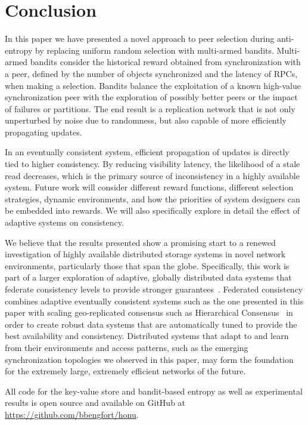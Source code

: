 \section*{Conclusion}

In this paper we have presented a novel approach to peer selection during
anti-entropy by replacing uniform random selection with multi-armed bandits.
Multi-armed bandits consider the historical reward obtained from
synchronization with a peer, defined by the number of objects synchronized
and the latency of RPCs, when making a selection.
Bandits balance the exploitation of a known high-value synchronization
peer with the exploration of possibly better peers or the impact of
failures or partitions.
The end result is a replication network that is not only unperturbed by noise
due to randomness, but also capable of more efficiently propagating updates.

In an eventually consistent system, efficient propagation of updates is
directly tied to higher consistency.
By reducing visibility latency, the likelihood of a stale read decreases,
which is the primary source of inconsistency in a highly available system.
Future work will consider different reward functions, different selection
strategies, dynamic environments, and how the priorities of system designers
can be embedded into rewards.
We will also specifically explore in detail the effect of adaptive systems
on consistency.

We believe that the results presented show a promising start to a renewed
investigation of highly available distributed storage systems in novel
network environments, particularly those that span the globe.
Specifically, this work is part of a larger exploration of adaptive,
globally distributed data systems that federate consistency levels to provide
stronger guarantees~\cite{bengfort_federating_2017}.
Federated consistency combines adaptive eventually consistent systems such as
the one presented in this paper with scaling geo-replicated consensus such as
Hierarchical Consensus~\cite{bengfort_brief_2017} in order to create robust
data systems that are automatically tuned to provide the best availability
and consistency.
Distributed systems that adapt to and learn from their environments and
access patterns, such as the emerging synchronization topologies we observed
in this paper, may form the foundation for the extremely large, extremely
efficient networks of the future.

All code for the key-value store and bandit-based entropy as well as
experimental results is open source and available on GitHub at
\url{https://github.com/bbengfort/honu}.
